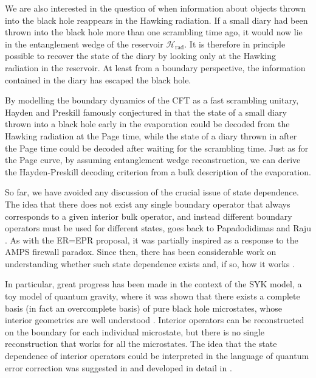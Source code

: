 \documentclass[12pt]{article}
\begin{document}
We are also interested in the question of when information about objects thrown into the black hole reappears in the Hawking radiation. If a small diary had been thrown into the black hole more than one scrambling time ago, it would now lie in the entanglement wedge of the reservoir $\mathcal{H}_\text{rad}$. It is therefore in principle possible to recover the state of the diary by looking only at the Hawking radiation in the reservoir. At least from a boundary perspective, the information contained in the diary has escaped the black hole.

By modelling the boundary dynamics of the CFT as a fast scrambling unitary, Hayden and Preskill famously conjectured in \cite{hayden2007black} that the state of a small diary thrown into a black hole early in the evaporation could be decoded from the Hawking radiation at the Page time, while the state of a diary thrown in after the Page time could be decoded after waiting for the scrambling time. Just as for the Page curve, by assuming entanglement wedge reconstruction, we can derive the Hayden-Preskill decoding criterion from a bulk description of the evaporation.

So far, we have avoided any discussion of the crucial issue of state dependence. The idea that there does not exist any single boundary operator that always corresponds to a given interior bulk operator, and instead different boundary operators must be used for different states, goes back to Papadodidimas and Raju \cite{papadodimas2013infalling, papadodimas2014state}.  As with the ER=EPR proposal, it was partially inspired as a response to the AMPS firewall paradox. Since then, there has been considerable work on understanding whether such state dependence exists and, if so, how it works \cite{harlow2014aspects, papadodimas2016remarks, de2018interior}.

In particular, great progress has been made in the context of the SYK model, a toy model of quantum gravity, where it was shown that there exists a complete basis (in fact an overcomplete basis) of pure black hole microstates, whose interior geometries are well understood \cite{kourkoulou2017pure}. Interior operators can be reconstructed on the boundary for each individual microstate, but there is no single reconstruction that works for all the microstates. The idea that the state dependence of interior operators could be interpreted in the language of quantum error correction was suggested in \cite{hayden2018learning} and developed in detail in \cite{almheiri2018holographic}.
\end{document}
